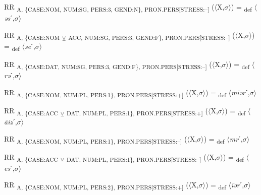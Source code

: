 {\begin{exe}
 RR \textsubscript{A, \{CASE:NOM, NUM:SG, PERS:3, GEND:N\}, PRON.PERS[STRESS:–]} ($\langle$X,$\sigma $$\rangle$) = \textsubscript{def} $\langle$\textit{əs}ˊ,$\sigma $$\rangle$
\end{exe}

\begin{exe}
 RR \textsubscript{A, \{CASE:NOM} \textsubscript{${\veebar}$}\textsubscript{ ACC, NUM:SG, PERS:3, GEND:F\}, PRON.PERS[STRESS:–]} ($\langle$X,$\sigma $$\rangle$) = \textsubscript{def} $\langle$\textit{se}ˊ,$\sigma $$\rangle$
\end{exe}

\begin{exe}
 RR \textsubscript{A, \{CASE:DAT, NUM:SG, PERS:3, GEND:F\}, PRON.PERS[STRESS:–]} ($\langle$X,$\sigma $$\rangle$) = \textsubscript{def} $\langle$\textit{rə}ˊ,$\sigma $$\rangle$
\end{exe}

\begin{exe}
 RR \textsubscript{A, \{CASE:NOM, NUM:PL, PERS:1\}, PRON.PERS[STRESS:+]} ($\langle$X,$\sigma $$\rangle$) = \textsubscript{def} $\langle$\textit{m\=iər}ˊ,$\sigma $$\rangle$
\end{exe}

\begin{exe}
 RR \textsubscript{A, \{CASE:ACC} \textsubscript{${\veebar}$}\textsubscript{ DAT, NUM:PL, PERS:1\}, PRON.PERS[STRESS:+]} ($\langle$X,$\sigma $$\rangle$) = \textsubscript{def} $\langle$\textit{\=aiz}ˊ,$\sigma $$\rangle$
\end{exe}

\begin{exe}
 RR \textsubscript{A, \{CASE:NOM, NUM:PL, PERS:1\}, PRON.PERS[STRESS:–]} ($\langle$X,$\sigma $$\rangle$) = \textsubscript{def} $\langle$\textit{mr}ˊ,$\sigma $$\rangle$
\end{exe}

\begin{exe}
 RR \textsubscript{A, \{CASE:ACC} \textsubscript{${\veebar}$}\textsubscript{ DAT, NUM:PL, PERS:1\}, PRON.PERS[STRESS:–]} ($\langle$X,$\sigma $$\rangle$) = \textsubscript{def} $\langle$\textit{es}ˊ,$\sigma $$\rangle$
\end{exe}

\begin{exe}
 RR \textsubscript{A, \{CASE:NOM, NUM:PL, PERS:2\}, PRON.PERS[STRESS:+]} ($\langle$X,$\sigma $$\rangle$) = \textsubscript{def} $\langle$\textit{\=iər}ˊ,$\sigma $$\rangle$
\end{exe}

}
